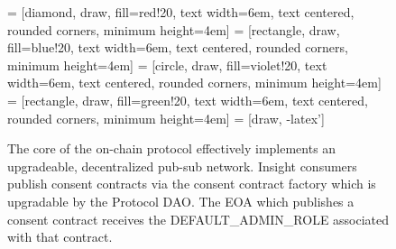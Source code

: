 \begin{figure}[ht] 
    \centering
     = [diamond, draw, fill=red!20, 
    text width=6em, text centered, rounded corners, minimum height=4em] 
     = [rectangle, draw, fill=blue!20, 
    text width=6em, text centered, rounded corners, minimum height=4em]
     = [circle, draw, fill=violet!20, 
        text width=6em, text centered, rounded corners, minimum height=4em]
     = [rectangle, draw, fill=green!20, 
        text width=6em, text centered, rounded corners, minimum height=4em]
     = [draw, -latex']
    
    \caption{The core of the on-chain protocol effectively implements an upgradeable, decentralized pub-sub 
    network. Insight consumers publish consent contracts via the consent contract factory which is 
    upgradable by the Protocol DAO. The EOA which publishes a consent contract receives the 
    DEFAULT_ADMIN_ROLE associated with that contract.}
    \label{fig:ConsentFactory}
  \end{figure}